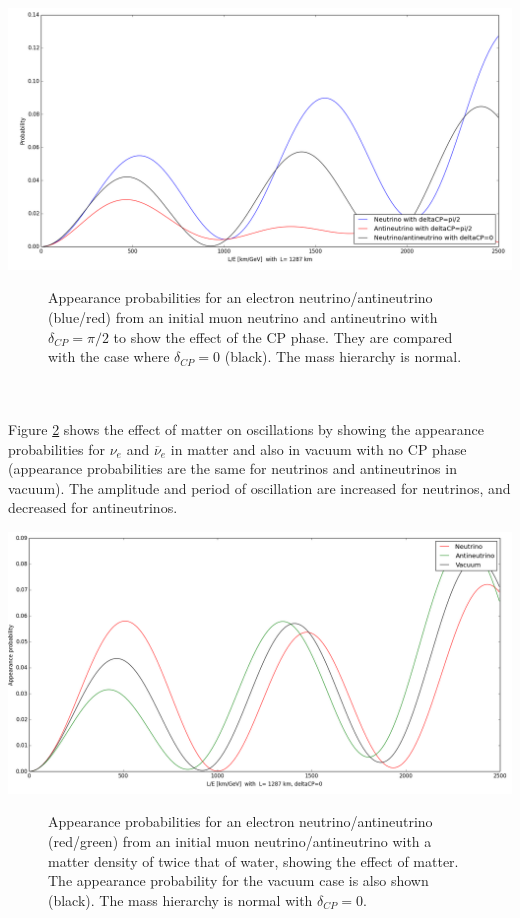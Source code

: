 \documentclass[12pt]{article}
\begin{document}
\begin{center}
\includegraphics[scale=0.4]{CP_effect.png}
\begin{figure}[h!]
\caption{Appearance probabilities for an electron neutrino/antineutrino (blue/red) from an initial muon neutrino and antineutrino with $\delta_{CP}=\pi/2$ to show the effect of the CP phase. They are compared with the case where $\delta_{CP}=0$ (black). The mass hierarchy is normal.}
\label{fig:CP}
\end{figure}
\end{center}\\\\
Figure \ref{fig:matter} shows the effect of matter on oscillations by showing the appearance probabilities for $\nu_{e}$ and $\overline{\nu}_{e}$ in matter and also in vacuum with no CP phase (appearance probabilities are the same for neutrinos and antineutrinos in vacuum). The amplitude and period of oscillation are increased for neutrinos, and decreased for antineutrinos.
\begin{center}
\includegraphics[scale=0.4]{matter_effect.png}
\begin{figure}[h!]
\caption{Appearance probabilities for an electron neutrino/antineutrino (red/green) from an initial muon neutrino/antineutrino with a matter density of twice that of water, showing the effect of matter. The appearance probability for the vacuum case is also shown (black). The mass hierarchy is normal with $\delta_{CP}=0$.}
\label{fig:matter}
\end{figure}
\end{center}\\\\
\end{document}
